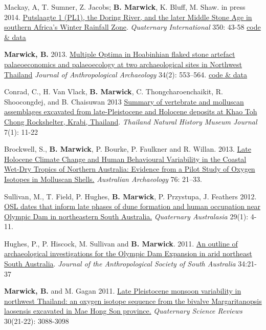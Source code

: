 \documentclass[11pt,article,oneside]{memoir}
\begin{document}
{{{{\ind Mackay, A, T. Sumner, Z. Jacobs; \textbf{B. Marwick}, K. Bluff, M. Shaw. in press 2014.  \href{http://faculty.washington.edu/bmarwick/PDFs/Mackay_et_al_2014.pdf}{Putslaagte 1 (PL1), the Doring River, and the later Middle Stone Age in southern Africa's Winter Rainfall Zone}. \textit{Quaternary International} 350: 43-58 \href{https://github.com/benmarwick/Particle-size-analysis-Putslaagte-1}{code \& data}

\ind \textbf{Marwick, B.} 2013. \href{http://faculty.washington.edu/bmarwick/PDFs/Marwick_2013_JAA.pdf}{Multiple Optima in Hoabinhian flaked stone artefact palaeoeconomics and palaeoecology at two archaeological sites in Northwest Thailand} \textit{Journal of Anthropological Archaeology} 34(2): 553–564. \href{http://dx.doi.org/10.6084/m9.figshare.765252}{code \& data}

\ind Conrad, C., H. Van Vlack, \textbf{B. Marwick}, C. Thongcharoenchaikit, R. Shoocongdej, and B. Chaisuwan 2013 \href{http://faculty.washington.edu/bmarwick/PDFs/Conrad_et_al_2013_TNHMJ.pdf}{Summary of vertebrate and molluscan assemblages excavated from late-Pleistocene and Holocene deposits at Khao Toh Chong Rockshelter, Krabi, Thailand}. \textit{Thailand Natural History Museum Journal} 7(1): 11-22

\ind Brockwell, S., \textbf{B. Marwick}, P. Bourke, P. Faulkner and R. Willan. 2013. \href{http://faculty.washington.edu/bmarwick/PDFs/Brockwell_et_al_2013_AA.pdf}{Late Holocene Climate Change and Human Behavioural Variability in the Coastal Wet-Dry Tropics of Northern Australia: Evidence from a Pilot Study of Oxygen Isotopes in Molluscan Shells.} \textit{Australian Archaeology} 76: 21–33.

\ind Sullivan, M., T. Field, P. Hughes, \textbf{B. Marwick}, P. Przystupa, J. Feathers 2012. \href{http://faculty.washington.edu/bmarwick/PDFs/Sullivan_et_al_2012_OSL_dates_ODX.pdf}{OSL dates that inform late phases of dune formation and human occupation near Olympic Dam in northeastern South Australia.} \textit{Quaternary Australasia} 29(1): 4-11.

\ind Hughes, P., P. Hiscock, M. Sullivan and \textbf{B. Marwick}. 2011. \href{http://faculty.washington.edu/bmarwick/PDFs/Hughes_et_al_2011_JASSA.pdf}{An outline of archaeological investigations for the Olympic Dam Expansion in arid northeast South Australia}. \textit{Journal of the Anthropological Society of South Australia} 34:21-37

\ind \textbf{Marwick, B.} and M. Gagan 2011. \href{http://faculty.washington.edu/bmarwick/PDFs/Marwick_and_Gagan_2011_QSR.pdf}{Late Pleistocene monsoon variability in northwest Thailand: an oxygen isotope sequence from the bivalve Margaritanopsis laosensis excavated in Mae Hong Son province.} \textit{Quaternary Science Reviews} 30(21-22): 3088-3098

}}}}
\end{document}
